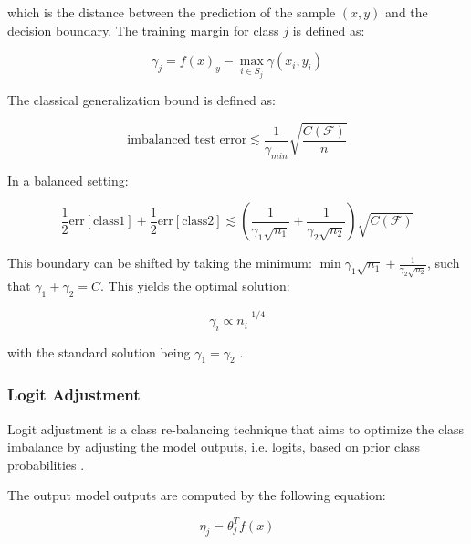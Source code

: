 \noindent which is the distance between the prediction of the sample $(x,y)$ and the decision boundary. The training margin for class $j$ is defined as:

\begin{equation}
    \label{eq:margin_class_def}
    \gamma_j = f(x)_y - \max_{i \in S_j}\gamma(x_i,y_i)
\end{equation}

\noindent The classical generalization bound is defined as:

\begin{equation}
    \label{eq:gen_bound}
    \text{imbalanced test error}\lesssim \frac{1}{\gamma_{min}}\sqrt{\frac{C(\mathcal{F})}{n}}
\end{equation}

\noindent In a balanced setting:

\begin{equation}
    \frac{1}{2}\text{err}[\text{class1}]+\frac{1}{2}\text{err}[\text{class2}] \lesssim \left(\frac{1}{\gamma_1\sqrt{n_1}}+\frac{1}{\gamma_2\sqrt{n_2}}\right)\sqrt{C(\mathcal{F})}
\end{equation}

\noindent This boundary can be shifted by taking the minimum: $\min{\gamma_1\sqrt{n_1}}+\frac{1}{\gamma_2\sqrt{n_2}}$, such that $\gamma_1+\gamma_2=C$. This yields the optimal solution:

\begin{equation}
    \label{eq:opt_margin}
    \gamma_i\varpropto n^{-1/4}_i 
\end{equation}

\noindent with the standard solution being $\gamma_1=\gamma_2$ \cite{cao2019learningimbalanceddatasetslabeldistributionaware}. 

\subsubsection{Logit Adjustment}
\label{sec:logit_adjustment}
Logit adjustment is a class re-balancing technique that aims to optimize the class imbalance by adjusting the model outputs, i.e. logits, based on prior class probabilities \cite{menon2021longtaillearninglogitadjustment,ren2020balancedmetasoftmaxlongtailedvisual}.  

The output model outputs are computed by the following equation:

\begin{equation}
    \label{eq:logits}
    \eta_j = \theta^T_j f(x)
\end{equation}

